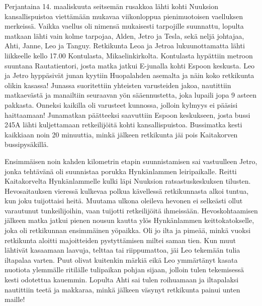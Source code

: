 \begin{multicols}{2}

\noindent Perjantaina 14. maaliskuuta seitsemän rusakkoa lähti kohti Nuuksion
kansallispuistoa viettämään mukavaa viikonloppua pienimuotoisen vaelluksen
merkeissä. Vaikka vaellus oli nimensä mukaisesti tarpojille suunnattu, lopulta
matkaan lähti vain kolme tarpojaa, Alden, Jetro ja Tesla, sekä neljä johtajaa,
Ahti, Janne, Leo ja Tanguy. Retkikunta Leoa ja Jetroa lukuunottamatta lähti
liikkeelle kello 17.00 Kontulasta, Mikaelinkirkolta. Kontulasta hypättiin
metroon suuntana Rautatientori, josta matka jatkui E-junalla kohti Espoon
keskusta. Leo ja Jetro hyppäsivät junan kyytiin Huopalahden asemalta ja näin
koko retkikunta olikin kasassa! Junassa suoritettiin yhteisten varusteiden
jakoa, nautittiin matkaevästä ja manailtiin seuraavan yön sääennustetta, joka
lupaili jopa 9 asteen pakkasta. Onneksi kaikilla oli varusteet kunnossa,
jolloin kylmyys ei pääsisi haittaamaan! Junamatkan päätteeksi saavuttiin Espoon
keskukseen, josta bussi 245A lähti kuljettamaan retkeilijöitä kohti
kansallispuistoa. Bussimatka kesti kaikkiaan noin 20 minuuttia, minkä jälkeen
retkikunta jäi pois Kaitakorven bussipysäkillä. 

Ensimmäisen noin kahden kilometrin etapin suunnistamisen sai vastuulleen Jetro,
jonka tehtävänä oli suunnistaa porukka Hynkänlammen leiripaikalle. Reitti
Kaitakorvelta Hynkänlammelle kulki läpi Nuuksion ratsastuskeskuksen tilusten.
Hevosaitauksen vieressä kulkevaa polkua kävellessä retkikunnasta alkoi tuntua,
kun joku tuijottaisi heitä. Muutama ulkona oleileva hevonen ei selkeästi ollut
varautunut tunkeilijoihin, vaan tuijotti retkeilijöitä ihmeissään.
Hevoskohtaamisen jälkeen matka jatkui pienen nousun kautta ylös Hynkänlammen
keittokatokselle, joka oli retkikunnan ensimmäinen yöpaikka. Oli jo ilta ja
pimeää, minkä vuoksi retkikunta aloitti majoitteiden pystyttämisen miltei saman
tien. Kun muut lähtivät kasaamaan laavuja, telttaa tai riippumattoa, jäi Leo
tekemään tulia iltapalaa varten. Puut olivat kuitenkin märkiä eikä Leo
ymmärtänyt kasata nuotiota ylemmälle ritilälle tulipaikan pohjan sijaan,
jolloin tulen tekemisessä kesti odotettua kauemmin. Lopulta Ahti sai tulen
roihuamaan ja iltapalaksi nautittiin teetä ja makkaraa, minkä jälkeen väsynyt
retkikunta painui unten maille!


\end{multicols}

